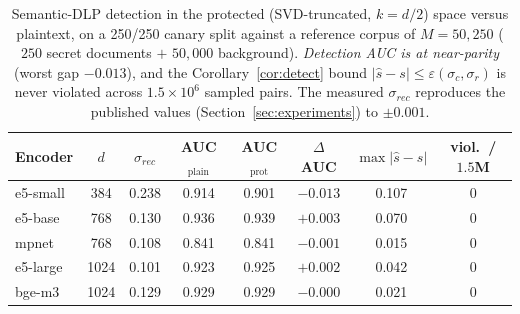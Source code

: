 \begin{table}[t]\centering
\caption{Semantic-DLP detection in the protected (SVD-truncated, $k=d/2$) space versus plaintext, on a 250/250 canary split against a reference corpus of $M=50{,}250$ ($250$ secret documents $+$ $50{,}000$ background). \emph{Detection AUC is at near-parity} (worst gap $-0.013$), and the Corollary~\ref{cor:detect} bound $|\hat s-s|\le\varepsilon(\sigma_c,\sigma_r)$ is never violated across $1.5\times10^{6}$ sampled pairs. The measured $\sigma_{rec}$ reproduces the published values (Section~\ref{sec:experiments}) to $\pm0.001$.}\label{tab:dlp}
\small\begin{tabular}{lccccccc}
\toprule
Encoder & $d$ & $\sigma_{rec}$ & AUC$_{\mathrm{plain}}$ & AUC$_{\mathrm{prot}}$ & $\Delta$AUC & $\max|\hat s-s|$ & viol.\ /$1.5$M \\
\midrule
e5-small & 384 & 0.238 & 0.914 & 0.901 & $-0.013$ & 0.107 & 0 \\
e5-base & 768 & 0.130 & 0.936 & 0.939 & $+0.003$ & 0.070 & 0 \\
mpnet & 768 & 0.108 & 0.841 & 0.841 & $-0.001$ & 0.015 & 0 \\
e5-large & 1024 & 0.101 & 0.923 & 0.925 & $+0.002$ & 0.042 & 0 \\
bge-m3 & 1024 & 0.129 & 0.929 & 0.929 & $-0.000$ & 0.021 & 0 \\
\bottomrule
\end{tabular}
\end{table}